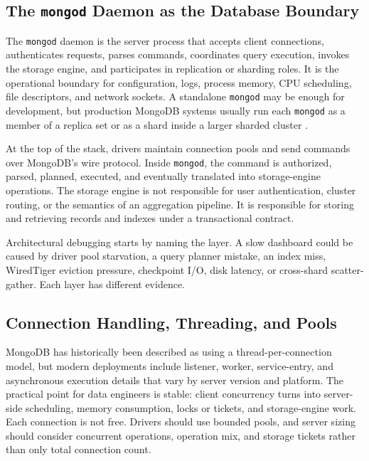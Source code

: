 \subsection{The \texttt{mongod} Daemon as the Database Boundary}
The \texttt{mongod} daemon is the server process that accepts client connections, authenticates requests, parses commands, coordinates query execution, invokes the storage engine, and participates in replication or sharding roles. It is the operational boundary for configuration, logs, process memory, CPU scheduling, file descriptors, and network sockets. A standalone \texttt{mongod} may be enough for development, but production MongoDB systems usually run each \texttt{mongod} as a member of a replica set or as a shard inside a larger sharded cluster \cite{mongodbReplicationDocs,mongodbShardingDocs}.

At the top of the stack, drivers maintain connection pools and send commands over MongoDB's wire protocol. Inside \texttt{mongod}, the command is authorized, parsed, planned, executed, and eventually translated into storage-engine operations. The storage engine is not responsible for user authentication, cluster routing, or the semantics of an aggregation pipeline. It is responsible for storing and retrieving records and indexes under a transactional contract.

\begin{notebox}
Architectural debugging starts by naming the layer. A slow dashboard could be caused by driver pool starvation, a query planner mistake, an index miss, WiredTiger eviction pressure, checkpoint I/O, disk latency, or cross-shard scatter-gather. Each layer has different evidence.
\end{notebox}

\subsection{Connection Handling, Threading, and Pools}
MongoDB has historically been described as using a thread-per-connection model, but modern deployments include listener, worker, service-entry, and asynchronous execution details that vary by server version and platform. The practical point for data engineers is stable: client concurrency turns into server-side scheduling, memory consumption, locks or tickets, and storage-engine work. Each connection is not free. Drivers should use bounded pools, and server sizing should consider concurrent operations, operation mix, and storage tickets rather than only total connection count.

